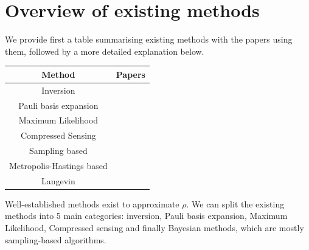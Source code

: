 \documentclass[12pt]{memoir}
\begin{document}
\section{Overview of existing methods}
We provide first a table summarising existing methods with the papers using them, followed by a more detailed explanation below.  

\begin{center}
    \begin{tabular}{|c|c|}
        \hline
        Method & Papers \\\hline\hline
        Inversion & \cite{meth:linear-inversion:vogel-risken, meth:linear-inversion:RMH, meth:linear-inversion:alquier} \\\hline
        Pauli basis expansion & \cite{Cai-2016}\\\hline
        Maximum Likelihood & \cite{Guta20,meth:ML:BDP,meth:ML:JKMW,meth:ML:Lvovsky,meth:ML:Blume-Kohout,meth:ML:Suzuki,meth:ML:Hradil2004} \\\hline
        Compressed Sensing & \cite{meth:CS:GLFSBE10,meth:CS:Gross-2011, meth:CS:Flammia-2012,meth:CS:Koltchinskii-2011}\\\hline
        Sampling based & \cite{meth:bayesian:smc:Ferrie-2014,meth:bayesian:smc:Kueng-2015, meth:bayesian:sis:Kravtsov-2013}\\\hline
        Metropolis-Hastings based & \cite{MA17,Mai22,LLJL20, meth:bayesian:mh:Blume-Kohout-2010}\\\hline
        Langevin & \cite{meth:bayesian:Langevin:ACMT2024}\\\hline
    \end{tabular}
\end{center}

Well-established methods exist to approximate $\rho$. We can split the existing methods into 5 main categories: inversion, Pauli basis expansion, Maximum Likelihood, Compressed sensing and finally Bayesian methods, which are mostly sampling-based algorithms.\medbreak
\end{document}
